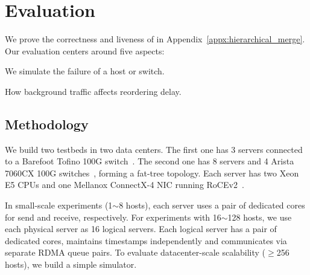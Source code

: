 \section{Evaluation}
\label{sec:evaluation}

We prove the correctness and liveness of \sys in Appendix~\ref{appx:hierarchical_merge}.
Our evaluation centers around five aspects:




 We simulate the failure of a host or switch.

 How background traffic affects reordering delay.



\subsection{Methodology}
\label{sec:testbed}

We build two testbeds in two data centers.
The first one has 3 servers connected to a Barefoot Tofino 100G switch~\cite{tofino}.
The second one has 8 servers and 4 Arista 7060CX 100G switches~\cite{arista}, forming a fat-tree topology.
Each server has two Xeon E5 CPUs and one Mellanox ConnectX-4 NIC running RoCEv2~\cite{infinibandrocev2}.


In small-scale experiments (1$\sim$8 hosts), each server uses a pair of dedicated cores for send and receive, respectively.
For experiments with 16$\sim$128 hosts, we use each physical server as 16 logical servers. Each logical server has a pair of dedicated cores, maintains timestamps independently and communicates via separate RDMA queue pairs.
To evaluate datacenter-scale scalability ($\ge$256 hosts), we build a simple simulator.


